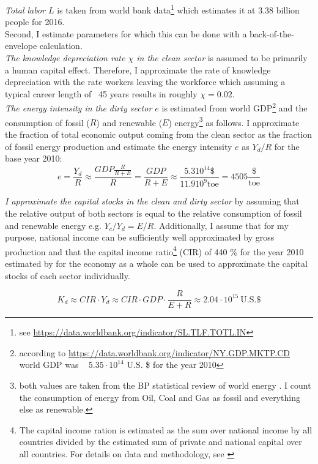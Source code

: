 \textit{Total labor $L$} is taken from world bank data\footnote{see \url{https://data.worldbank.org/indicator/SL.TLF.TOTL.IN}} which estimates it at 3.38 billion people for 2016.\\
Second, I estimate parameters for which this can be done with a back-of-the-envelope calculation.\\
\textit{The knowledge depreciation rate $\chi$ in the clean sector} is assumed to be primarily a human capital effect. Therefore, I approximate the rate of knowledge depreciation with the rate workers leaving the workforce which assuming a typical career length of ~45 years results in roughly $\chi=0.02$. \\
\textit{The energy intensity in the dirty sector $e$} is estimated from world GDP\footnote{according to \url{https://data.worldbank.org/indicator/NY.GDP.MKTP.CD} world GDP was ~ $5.35 \cdot 10^{14}$ U.S. \$ for the year 2010} and the consumption of fossil ($R$) and renewable ($E$) energy\footnote{both values are taken from the BP statistical review of world energy \cite{dudley2019bp}. I count the consumption of energy from Oil, Coal and Gas as fossil and everything else as renewable.} as follows. I approximate the fraction of total economic output coming from the clean sector as the fraction of fossil energy production and estimate the energy intensity $e$ as $Y_d/R$ for the base year 2010:
\begin{equation}
  e = \frac{Y_d}{R} \approx \frac{GDP \frac{R}{R+E}}{R} = \frac{GDP}{R+E} \approx \frac{5.3 10^{14} \$}{11.9 10^9 \mathrm{toe}} = 4505 \frac{\$}{\mathrm{toe}}
  \label{eq:energy_intensity_estimate}
\end{equation}

\textit{I approximate the capital stocks in the clean and dirty sector} by assuming that the relative output of both sectors is equal to the relative consumption of fossil and renewable energy e.g. $Y_c/Y_d = E/R$. Additionally, I assume that for my purpose, national income can be sufficiently well approximated by gross production and that the capital income ratio\footnote{The capital income ration is estimated as the sum over national income by all countries divided by the estimated sum of private and national capital over all countries. For details on data and methodology, see \cite{piketty2014technical}} (CIR) of 440 \% for the year 2010 estimated by \cite{piketty2014} for the economy as a whole can be used to approximate the capital stocks of each sector individually.

\begin{equation}
  K_d \approx CIR \cdot Y_d \approx CIR \cdot GDP \cdot \frac{R}{E + R} \approx 2.04 \cdot 10^{15} ~ \textrm{U.S.} \$
  \label{eq:approx_dirty_capital}
\end{equation}

